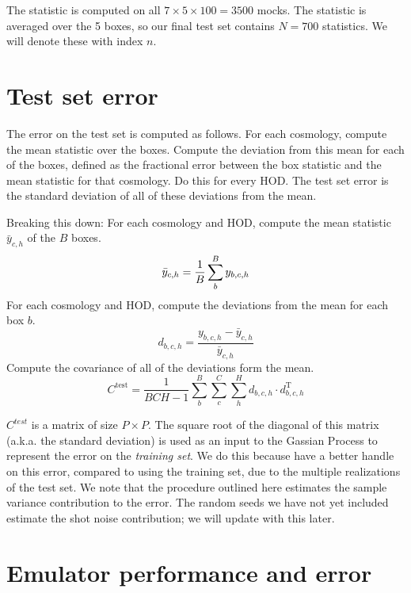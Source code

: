 \documentclass[12pt]{article}
\newcommand{\T}{^{\mathrm{T}}}
\newcommand{\cov}[1]{C^\text{#1}}
\begin{document}
The statistic is computed on all $7 \times 5 \times 100 = 3500$ mocks. 
The statistic is averaged over the 5 boxes, so our final test set contains $N=700$ statistics. 
We will denote these with index $n$.

\section{Test set error}

The error on the test set is computed as follows. 
For each cosmology, compute the mean statistic over the boxes.
Compute the deviation from this mean for each of the boxes, defined as the fractional error between the box statistic and the mean statistic for that cosmology. 
Do this for every HOD. 
The test set error is the standard deviation of all of these deviations from the mean.

Breaking this down: For each cosmology and HOD, compute the mean statistic $\bar{y}_{c,h}$ of the $B$ boxes.
\begin{equation}
    \bar{y}_{c,h} = \frac{1}{B} \sum_b^B {y_{b,c,h}} \\
\end{equation}
For each cosmology and HOD, compute the deviations from the mean for each box $b$.
\begin{equation}
    d_{b,c,h} = \frac{ {y_{b,c,h} - \bar{y}_{c,h}} } {\bar{y}_{c,h}}
\end{equation}
Compute the covariance of all of the deviations form the mean.
\begin{equation}
    \cov{test} = \frac{1}{BCH-1} \sum_{b}^B \sum_{c}^C \sum_{h}^H d_{b,c,h} \cdot d_{b,c,h}\T
\end{equation}

$C^{test}$ is a matrix of size $P \times P$.
The square root of the diagonal of this matrix (a.k.a. the standard deviation) is used as an input to the Gassian Process to represent the error on the \emph{training set}. %
We do this because have a better handle on this error, compared to using the training set, due to the multiple realizations of the test set.
We note that the procedure outlined here estimates the sample variance contribution to the error.
The random seeds we have not yet included estimate the shot noise contribution; we will update with this later.


\section{Emulator performance and error}
\end{document}
